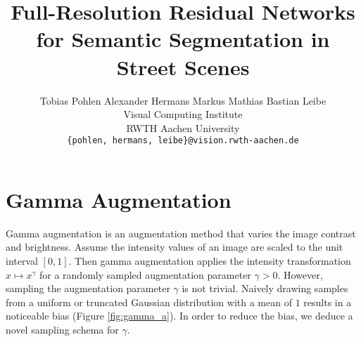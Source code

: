\documentclass[10pt,twocolumn,letterpaper]{article}
\begin{document}
\title{Full-Resolution Residual Networks for Semantic Segmentation in Street Scenes}

\author{Tobias Pohlen \hspace{10mm} Alexander Hermans \hspace{10mm} Markus Mathias \hspace{10mm} Bastian Leibe\\
Visual Computing Institute\\
RWTH Aachen University\\
{\tt\small \{pohlen, hermans, leibe\}@vision.rwth-aachen.de}
}

\maketitle




\section{Gamma Augmentation}
Gamma augmentation is an augmentation method that varies the image contrast and brightness.
Assume the intensity values of an image are scaled to the unit interval $[0, 1]$.
Then gamma augmentation applies the intensity transformation $x \mapsto x^\gamma$ for a randomly sampled augmentation parameter $\gamma > 0$. 
However, sampling the augmentation parameter $\gamma$ is not trivial.
Naively drawing samples from a uniform or truncated Gaussian distribution with a mean of $1$ results in a noticeable bias (Figure \ref{fig:gamma_a}).
In order to reduce the bias, we deduce a novel sampling schema for $\gamma$. 
\end{document}
